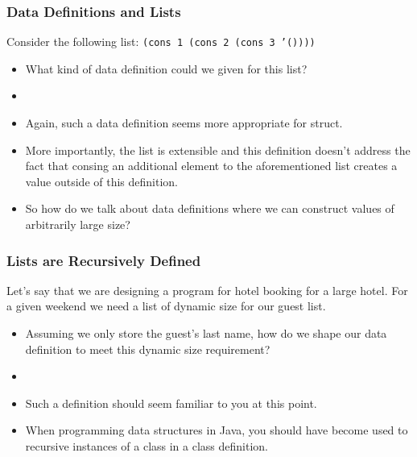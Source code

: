 \documentclass{beamer}
\begin{document}
\begin{frame}
  \frametitle{Data Definitions and Lists}
  Consider the following list: \texttt{(cons 1 (cons 2 (cons 3 '())))}
  \begin{itemize}
  \item<2-> What kind of data definition could we given for this list?
  \item<3-> \ThreeList
  \item<4-> Again, such a data definition seems more appropriate for struct.
  \item<5-> More importantly, the list is extensible and this definition
    doesn't address the fact that consing an additional element to
    the aforementioned list creates a value outside of this definition.
  \item<6-> So how do we talk about data definitions
    where we can construct values of arbitrarily large size?
  \end{itemize}
\end{frame}


\begin{frame}
  \frametitle{Lists are Recursively Defined}
  Let's say that we are designing a program for hotel booking for a large
  hotel. For a given weekend we need a list of dynamic size for our
  guest list.
  \begin{itemize}
  \item<2-> Assuming we only store the guest's last name, how do we shape
    our data definition to meet this dynamic size requirement?
  \item<3-> \ListOfNames
  \item<4-> Such a definition should seem familiar to you at this point.
  \item<5-> When programming data structures in Java, you should have
    become used to recursive instances of a class in a class definition.
  \end{itemize}
\end{frame}
\end{document}
